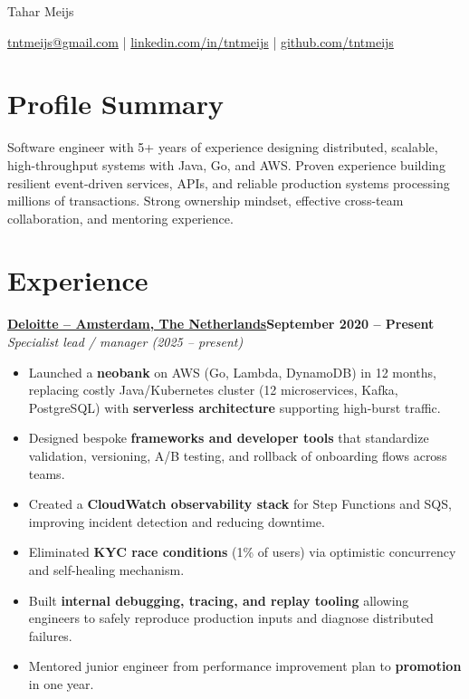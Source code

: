 \documentclass[11pt]{article}       %
\begin{document}
\centerline{\Huge Tahar Meijs}

\centerline{\href{mailto:tntmeijs@gmail.com}{tntmeijs@gmail.com} | \href{https://www.linkedin.com/in/tntmeijs/}{linkedin.com/in/tntmeijs} | \href{https://github.com/tntmeijs}{github.com/tntmeijs}}

\section*{Profile Summary}
Software engineer with 5+ years of experience designing distributed, scalable, high-throughput systems with Java, Go, and AWS. Proven experience building resilient event-driven services, APIs, and reliable production systems processing millions of transactions. Strong ownership mindset, effective cross-team collaboration, and mentoring experience.

\section*{Experience}
\textbf{\href{https://www.deloitte.com/nl/nl.html}{Deloitte -- Amsterdam, The Netherlands}\hfill September 2020 -- Present} \\
\textit{Specialist lead / manager (2025 -- present)} \\
\vspace{-9pt}
\begin{itemize}
  \item Launched a \textbf{neobank} on AWS (Go, Lambda, DynamoDB) in 12 months, replacing costly Java/Kubernetes cluster (12 microservices, Kafka, PostgreSQL) with \textbf{serverless architecture} supporting high-burst traffic.
  \item Designed bespoke \textbf{frameworks and developer tools} that standardize validation, versioning, A/B testing, and rollback of onboarding flows across teams.
  \item Created a \textbf{CloudWatch observability stack} for Step Functions and SQS, improving incident detection and reducing downtime.
  \item Eliminated \textbf{KYC race conditions} (1\% of users) via optimistic concurrency and self-healing mechanism.
  \item Built \textbf{internal debugging, tracing, and replay tooling} allowing engineers to safely reproduce production inputs and diagnose distributed failures.
  \item Mentored junior engineer from performance improvement plan to \textbf{promotion} in one year.
\end{itemize}
\end{document}
